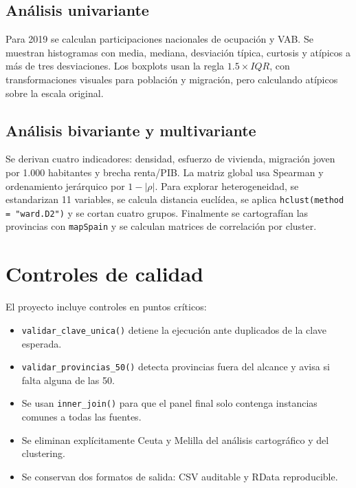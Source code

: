 \documentclass[11pt,a4paper]{article}
\newcommand{\code}[1]{\texttt{\small #1}}
\begin{document}
\subsection{Análisis univariante}
Para 2019 se calculan participaciones nacionales de ocupación y VAB. Se muestran histogramas con media, mediana, desviación típica, curtosis y atípicos a más de tres desviaciones. Los boxplots usan la regla $1.5\times IQR$, con transformaciones visuales para población y migración, pero calculando atípicos sobre la escala original.

\subsection{Análisis bivariante y multivariante}
Se derivan cuatro indicadores: densidad, esfuerzo de vivienda, migración joven por 1.000 habitantes y brecha renta/PIB. La matriz global usa Spearman y ordenamiento jerárquico por $1-|\rho|$. Para explorar heterogeneidad, se estandarizan 11 variables, se calcula distancia euclídea, se aplica \code{hclust(method = "ward.D2")} y se cortan cuatro grupos. Finalmente se cartografían las provincias con \code{mapSpain} y se calculan matrices de correlación por cluster.

\section{Controles de calidad}
El proyecto incluye controles en puntos críticos:
\begin{itemize}[leftmargin=1.5em]
\item \code{validar\_clave\_unica()} detiene la ejecución ante duplicados de la clave esperada.
\item \code{validar\_provincias\_50()} detecta provincias fuera del alcance y avisa si falta alguna de las 50.
\item Se usan \code{inner\_join()} para que el panel final solo contenga instancias comunes a todas las fuentes.
\item Se eliminan explícitamente Ceuta y Melilla del análisis cartográfico y del clustering.
\item Se conservan dos formatos de salida: CSV auditable y RData reproducible.
\end{itemize}
\end{document}
